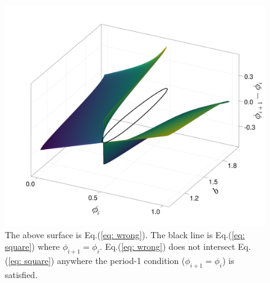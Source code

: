 \begin{figure}[H]
    \begin{center}
    \includegraphics[width=.7\textwidth]{figures/eqs18_fig.png}
    \end{center}
    \caption{The above surface is Eq.(\ref{eq: wrong}). The black line is Eq.(\ref{eq: square}) where $\phi_{i+1}=\phi_i$. Eq.(\ref{eq: wrong}) does not intersect Eq.(\ref{eq: square}) anywhere the period-1 condition ($\phi_{i+1}=\phi_i$) is satisfied.}
    \label{instabbound_restric}
\end{figure}